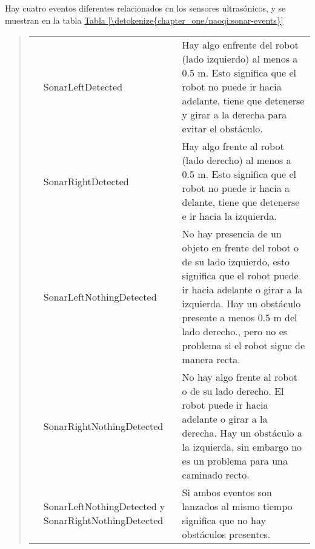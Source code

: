 Hay cuatro eventos diferentes relacionados cn los sensores ultrasónicos, y se
muestran en la tabla \hyperref[\detokenize{chapter_one/naoqi:sonar-events}]{Tabla \ref{\detokenize{chapter_one/naoqi:sonar-events}}}
\begin{quote}
\begin{savenotes}\sphinxattablestart
\centering
{}
\label{\detokenize{chapter_one/naoqi:sonar-events}}
\sphinxaftercaption
\begin{tabulary}{\linewidth}[t]{|T|T|T|}
\hline
{}\relax &\relax &\relax \\
\hline
\noindent{}
&
SonarLeftDetected
&
Hay algo enfrente del robot (lado izquierdo) al menos a 0.5 m. Esto significa que el robot no puede ir hacia adelante, tiene que detenerse y girar a la derecha para evitar el obstáculo.
\\
\hline
\noindent{}
&
SonarRightDetected
&
Hay algo frente al robot (lado derecho) al menos a 0.5 m. Esto significa que el robot no puede ir hacia a delante, tiene que detenerse e ir hacia la izquierda.
\\
\hline
\noindent{}
&
SonarLeftNothingDetected
&
No hay presencia de un objeto en frente del robot o de su lado izquierdo, esto significa que el robot puede ir hacia adelante o girar a la izquierda. Hay un obstáculo presente a menos 0.5 m del lado derecho., pero no es problema si el robot sigue de manera recta.
\\
\hline
\noindent{}
&
SonarRightNothingDetected
&
No hay algo frente al robot o de su lado derecho. El robot puede ir hacia adelante o girar a la derecha. Hay un obstáculo a la izquierda, sin embargo no es un problema para una caminado recto.
\\
\hline
\noindent{}
&
SonarLeftNothingDetected y SonarRightNothingDetected
&
Si ambos eventos son lanzados al mismo tiempo significa que no hay obstáculos presentes.
\\
\hline
\end{tabulary}
\par
\sphinxattableend\end{savenotes}
\end{quote}

